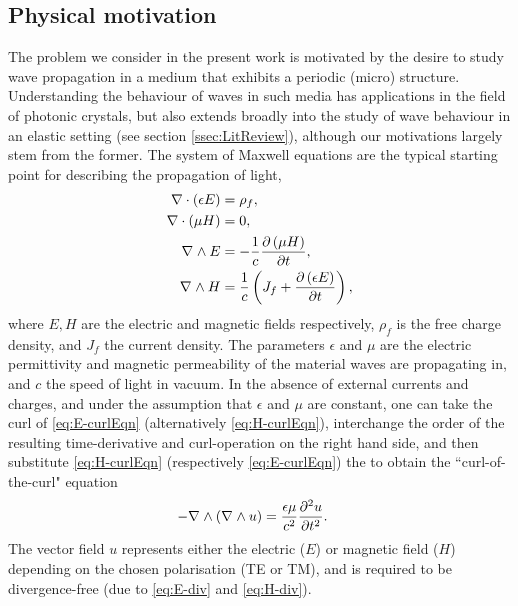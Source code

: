 \subsection{Physical motivation} \label{ssec:PhysMot}
The problem we consider in the present work is motivated by the desire to study wave propagation in a medium that exhibits a periodic (micro) structure.
Understanding the behaviour of waves in such media has applications in the field of photonic crystals, but also extends broadly into the study of wave behaviour in an elastic setting (see section \ref{ssec:LitReview}), although our motivations largely stem from the former.
The system of Maxwell equations are the typical starting point for describing the propagation of light,
\begin{subequations} \label{eq:MaxwellSystem}
	\begin{align} 
		\nabla \cdot \left( \epsilon E \right) &= \rho_{f}, \label{eq:E-div} \\
		\nabla \cdot \left( \mu H \right) &= 0, \label{eq:H-div} \\
		\nabla_{}\wedge E &= -\frac{1}{c} \dfrac{\partial \left( \mu H \right)}{\partial t}, \label{eq:E-curlEqn}\\
		\nabla_{}\wedge H &= \frac{1}{c}\left( J_{f} + \dfrac{\partial \left( \epsilon E \right)}{\partial t} \right), \label{eq:H-curlEqn}
	\end{align}
\end{subequations}
where $E, H$ are the electric and magnetic fields respectively, $\rho_{f}$ is the free charge density, and $J_f$ the current density. 
The parameters $\epsilon$ and $\mu$ are the electric permittivity and magnetic permeability of the material waves are propagating in, and $c$ the speed of light in vacuum.
In the absence of external currents and charges, and under the assumption that $\epsilon$ and $\mu$ are constant, one can take the curl of \eqref{eq:E-curlEqn} (alternatively \eqref{eq:H-curlEqn}), interchange the order of the resulting time-derivative and curl-operation on the right hand side, and then substitute \eqref{eq:H-curlEqn} (respectively \eqref{eq:E-curlEqn}) the to obtain the ``curl-of-the-curl" equation
\begin{align*}
	- \nabla_{}\wedge\left(  \nabla_{}\wedge u  \right) &= \frac{\epsilon\mu}{c^2}\dfrac{\partial^2 u}{\partial {t}^2}.
\end{align*}
The vector field $u$ represents either the electric ($E$) or magnetic field ($H$) depending on the chosen polarisation (TE or TM), and is required to be divergence-free (due to \eqref{eq:E-div} and \eqref{eq:H-div}).

